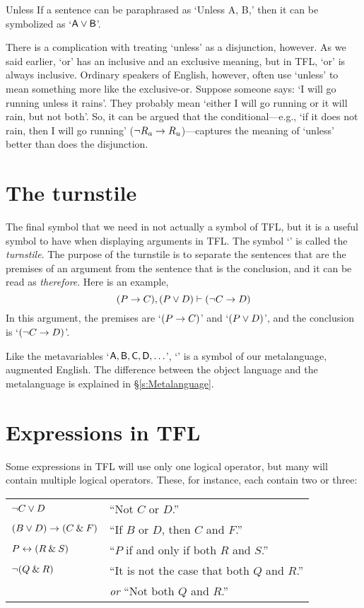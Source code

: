 \begin{factboxy}{Unless}
		If a sentence can be paraphrased as `Unless A, B,' then it can be symbolized as `$\mathsf{A}\vee\mathsf{B}$'.
\end{factboxy}

There is a complication with treating `unless' as a disjunction, however. As we said earlier, `or' has an inclusive and an exclusive meaning, but in TFL, `or' is always inclusive. Ordinary speakers of English, however, often use `unless' to mean something more like the exclusive-or. Suppose someone says: `I will go running unless it rains'. They probably mean `either I will go running or it will rain, but not both'. So, it can be argued that the conditional---e.g., `if it does not rain, then I will go running' (${\neg} R_a \rightarrow R_u$)---captures the meaning of `unless' better than does the disjunction.


\section{The turnstile}

The final symbol that we need in not actually a symbol of TFL, but it is a useful symbol to have when displaying arguments in TFL. The symbol `\proves' is called the \textit{turnstile}. The purpose of the turnstile is to separate the sentences that are the premises of an argument from the sentence that is the conclusion, and it can be read as \textit{therefore}. Here is an example,
$$(P \rightarrow C), (P \vee D) \vdash ({\neg} C \rightarrow D)$$
In this argument, the premises are `$(P \rightarrow C)$' and `$(P \vee D)$', and the conclusion is `$({\neg} C \rightarrow D)$'.


\begin{notebox}
Like the metavariables `$\mathsf{A}, \mathsf{B}, \mathsf{C}, \mathsf{D}, \ldots$', `\proves' is a symbol of our metalanguage, augmented English. The difference between the object language and the metalanguage is explained in \S\ref{s:Metalanguage}.
\end{notebox}


\section{Expressions in TFL}

Some expressions in TFL will use only one logical operator, but many will contain multiple logical operators. These, for instance, each contain two or three:

\begin{table*}[h]
\begin{tabular}{l  l}
${\neg} C \vee D$ \qquad \qquad \qquad \qquad  & ``Not $C$ or $D$.''\\
$(B \vee D) \rightarrow (C \mathbin{\&} F)$ & ``If $B$ or $D$, then $C$ and $F$.''\\
$P \leftrightarrow (R \mathbin{\&} S)$ & ``$P$ if and only if both $R$ and $S$.''\\
${\neg}(Q \mathbin{\&} R)$ & ``It is not the case that both $Q$ and $R$.''\\
&\textit{or} ``Not both $Q$ and $R$.'' 
\end{tabular}
\end{table*}

